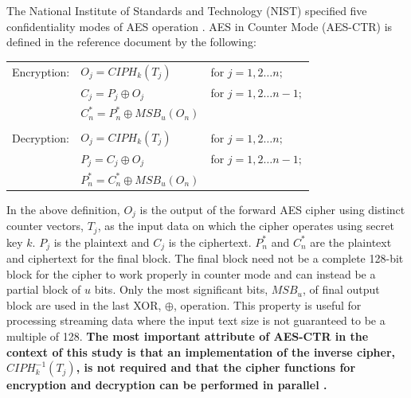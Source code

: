 \documentclass[12pt,journal,compsoc,onecolumn]{IEEEtran}
\begin{document}
The National Institute of Standards and Technology (NIST) specified five confidentiality modes of AES operation \cite{14}. AES in Counter Mode (AES-CTR) is defined in the reference document by the following:

\begin{table}[h]
	\centering
	\begin{tabular}{l l l}
	Encryption: & $O_j=CIPH_k(T_j)$ & for $j=1,2\dots n;$\\
		 & $C_j=P_j\oplus O_j$ & for $j=1,2\dots n-1;$\\
		 & $C^*_n=P^*_n\oplus MSB_u(O_n)$ & \\
		 \\
	Decryption: & $O_j=CIPH_k(T_j)$ & for $j=1,2\dots n;$\\
		 & $P_j=C_j\oplus O_j$ & for $j=1,2\dots n-1;$\\
		 & $P^*_n=C^*_n\oplus MSB_u(O_n)$ & 
	\end{tabular}
	\label{tab:ctr}
\end{table}

In the above definition, $O_j$ is the output of the forward AES cipher using distinct counter vectors, $T_j$, as the input data on which the cipher operates using secret key $k$. $P_j$ is the plaintext and $C_j$ is the ciphertext. $P^*_n$ and $C^*_n$ are the plaintext and ciphertext for the final block. The final block need not be a complete 128-bit block for the cipher to work properly in counter mode and can instead be a partial block of $u$ bits. Only the most significant bits, $MSB_u$, of final output block are used in the last XOR, $\oplus$, operation.  This property is useful for processing streaming data where the input text size is not guaranteed to be a multiple of 128\cite{15}\cite{16}. \textbf{The most important attribute of AES-CTR in the context of this study is that an implementation of the inverse cipher, $CIPH^{-1}_k(T_j)$, is not required and that the cipher functions for encryption and decryption can be performed in parallel \cite{10}.}

\end{document}
